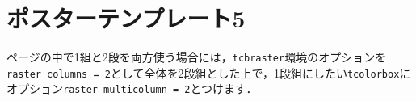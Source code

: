 \documentclass[12pt, a4j, dvipdfmx, jis2004]{jsarticle}
\begin{document}
\newpage
\section*{ポスターテンプレート5}
\begin{tcbraster}[raster columns = 2, raster equal height = rows]
	\begin{tcolorbox}[title = \texttt{raster multicolumn}, raster multicolumn = 2]
	ページの中で1組と2段を両方使う場合には，\texttt{tcbraster}環境のオプションを\texttt{raster columns = 2}として全体を2段組とした上で，1段組にしたい\texttt{tcolorbox}にオプション\texttt{raster multicolumn = 2}とつけます．
	\end{tcolorbox}
	\begin{tcolorbox}[title = lipsum7-2]
	\lipsum[7][2-17]
	\end{tcolorbox}
	\begin{tcolorbox}[title = lipsum8]
	\lipsum[8]
	\end{tcolorbox}
	\begin{tcolorbox}[title = lipsum9, raster multicolumn = 2]
	\lipsum[9]
	\end{tcolorbox}
\end{tcbraster}

\newpage
\end{document}
